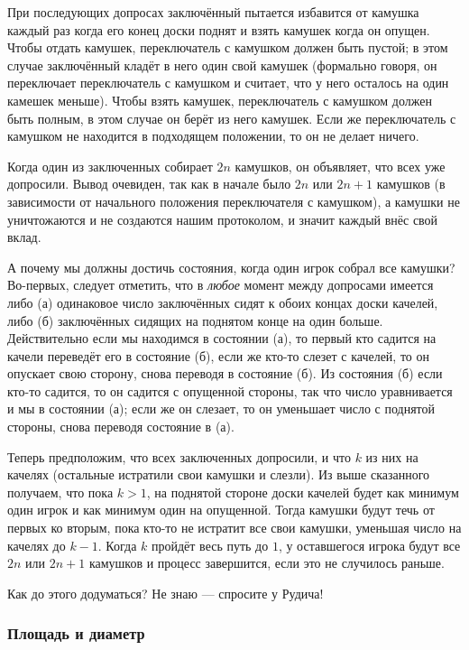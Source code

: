При последующих допросах заключённый пытается избавится от камушка каждый раз когда его конец доски поднят
и взять камушек когда он опущен.
Чтобы отдать камушек, переключатель с камушком должен быть пустой;
в этом случае заключённый 
кладёт в него один свой камушек (формально говоря, он переключает переключатель с камушком и считает, что у него осталось на один камешек меньше).
Чтобы взять камушек, переключатель с камушком должен быть полным, в этом случае он берёт из него камушек.
Если же переключатель с камушком не находится в подходящем положении, то он не делает ничего.

Когда один из заключенных собирает $2n$ камушков, он объявляет, что всех уже допросили.
Вывод очевиден, так как в начале было $2n$ или $2n+1$ камушков (в зависимости от начального положения переключателя с камушком), а камушки не уничтожаются и не создаются нашим протоколом, и значит каждый внёс свой вклад.

А почему мы должны достичь состояния, когда один игрок собрал все камушки?
Во-первых, следует отметить, что в \emph{любое} момент между допросами имеется либо 
(а) одинаковое число заключённых сидят к обоих концах доски качелей, либо 
(б) заключённых сидящих на поднятом конце на один больше.
Действительно если мы находимся в состоянии (а), то первый кто садится на качели переведёт его в состояние (б), если же кто-то слезет с качелей, то он опускает свою сторону, снова переводя в состояние (б).
Из состояния (б) если кто-то садится, то он садится с опущенной стороны, так что число уравнивается и мы в состоянии (а);
если же он слезает, то он уменьшает число с поднятой стороны, снова переводя состояние в (а).

Теперь предположим, что всех заключенных допросили, и что $k$ из них на качелях (остальные истратили свои камушки и слезли).
Из выше сказанного получаем, что пока $k>1$, на поднятой стороне доски качелей будет как минимум один игрок и как минимум один на опущенной.
Тогда камушки будут течь от первых ко вторым, пока кто-то не истратит все свои камушки, уменьшая число на качелях до $k-1$.
Когда $k$ пройдёт весь путь до $1$, у оставшегося игрока будут все $2n$ или $2n+1$ камушков и процесс завершится, если это не случилось раньше.
\heart

Как до этого додуматься?
Не  знаю --- спросите у Рудича!

\subsubsection*{Площадь и диаметр}

